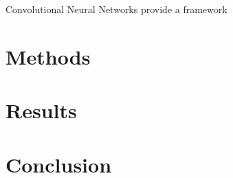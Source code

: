 \documentclass[]{article}
\begin{document}
Convolutional Neural Networks provide a framework 
\section{Methods}
\section{Results}

\section{Conclusion}
\end{document}
